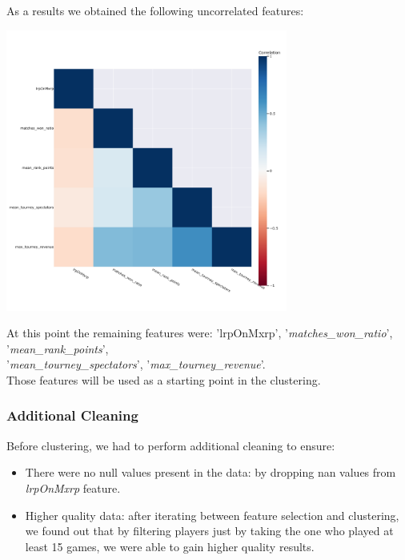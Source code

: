 \documentclass{article}
\begin{document}
As a results we obtained the following uncorrelated features:
\begin{center}
    \includegraphics[width=350px]{plots/correlation_plot}
    \label{fig:correlation_plot}
    \label{fig1}
\end{center}
At this point the remaining features were: 'lrpOnMxrp', '\textit{matches\_won\_ratio}', '\textit{mean\_rank\_points}',\\ '\textit{mean\_tourney\_spectators}', '\textit{max\_tourney\_revenue}'.\\
Those features will be used as a starting point in the clustering.

\subsubsection{Additional Cleaning}
Before clustering, we had to perform additional cleaning to ensure:
\begin{itemize}
    \item There were no null values present in the data: by dropping nan values from \textit{lrpOnMxrp} feature.
    \item Higher quality data: after iterating between feature selection and clustering, we found out that by filtering players just by taking the one who played at least 15 games, we were able to gain higher quality results.
\end{itemize}
\end{document}
